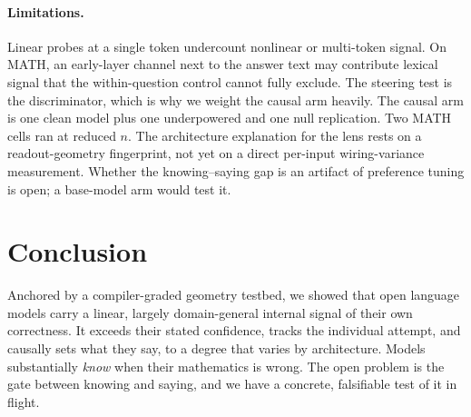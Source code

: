 \documentclass{article}
\begin{document}
\paragraph{Limitations.}
Linear probes at a single token undercount nonlinear or multi-token signal.
On MATH, an early-layer channel next to the answer text may contribute lexical signal that the within-question control cannot fully exclude.
The steering test is the discriminator, which is why we weight the causal arm heavily.
The causal arm is one clean model plus one underpowered and one null replication.
Two MATH cells ran at reduced $n$.
The architecture explanation for the lens rests on a readout-geometry fingerprint, not yet on a direct per-input wiring-variance measurement.
Whether the knowing--saying gap is an artifact of preference tuning is open; a base-model arm would test it.

\section{Conclusion}
\label{sec:conclusion}

Anchored by a compiler-graded geometry testbed, we showed that open language models carry a linear, largely domain-general internal signal of their own correctness.
It exceeds their stated confidence, tracks the individual attempt, and causally sets what they say, to a degree that varies by architecture.
Models substantially \emph{know} when their mathematics is wrong.
The open problem is the gate between knowing and saying, and we have a concrete, falsifiable test of it in flight.



\end{document}
